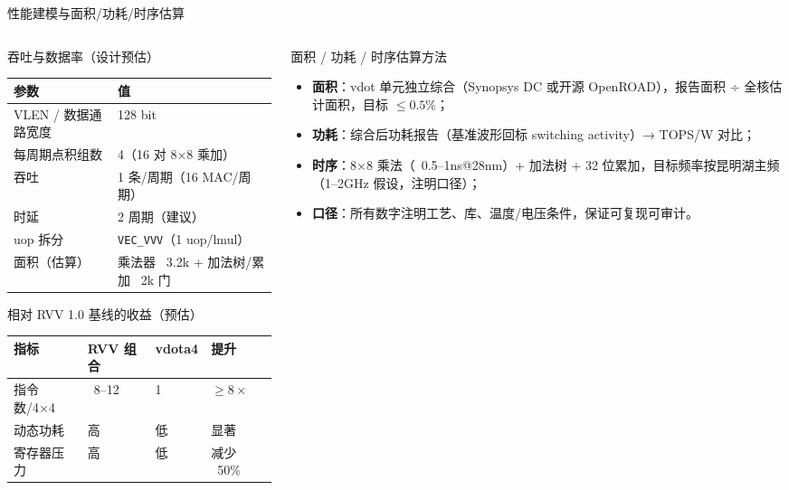 \documentclass[aspectratio=169]{beamer}
\newcommand{\smalltable}[1]{\par\centering\scriptsize #1\par}
\begin{document}
\begin{frame}{性能建模与面积/功耗/时序估算}
\vspace{-0.65em}
\begin{columns}[T]
\begin{column}{0.48\textwidth}
\begin{block}{吞吐与数据率（设计预估）}
\smalltable{%
\begin{tabular}{@{}ll@{}}
\toprule
参数 & 值 \\
\midrule
VLEN / 数据通路宽度 & 128 bit \\
每周期点积组数 & 4（16 对 8×8 乘加） \\
吞吐 & 1 条/周期（16 MAC/周期） \\
时延 & 2 周期（建议） \\
uop 拆分 & \texttt{VEC\_VVV}（1 uop/lmul） \\
面积（估算） & 乘法器 ~3.2k + 加法树/累加 ~2k 门 \\
\bottomrule
\end{tabular}}
\end{block}
\begin{block}{相对 RVV 1.0 基线的收益（预估）}
\smalltable{%
\begin{tabular}{@{}llll@{}}
\toprule
指标 & RVV 组合 & vdota4 & 提升 \\
\midrule
指令数/4×4 & ~8–12 & 1 & $\ge 8\times$ \\
动态功耗 & 高 & 低 & 显著 \\
寄存器压力 & 高 & 低 & 减少 ~50\% \\
\bottomrule
\end{tabular}}
\end{block}
\end{column}
\begin{column}{0.5\textwidth}
\begin{block}{面积 / 功耗 / 时序估算方法}
\begin{itemize}\footnotesize
  \item \textbf{面积}：vdot 单元独立综合（Synopsys DC 或开源 OpenROAD），报告面积 ÷ 全核估计面积，目标 $\le 0.5\%$；
  \item \textbf{功耗}：综合后功耗报告（基准波形回标 switching activity）→ TOPS/W 对比；
  \item \textbf{时序}：8×8 乘法（~0.5–1ns@28nm）+ 加法树 + 32 位累加，目标频率按昆明湖主频（1–2GHz 假设，注明口径）；
  \item \textbf{口径}：所有数字注明工艺、库、温度/电压条件，保证可复现可审计。
\end{itemize}

\end{block}
\end{column}
\end{columns}
\end{frame}
\end{document}
